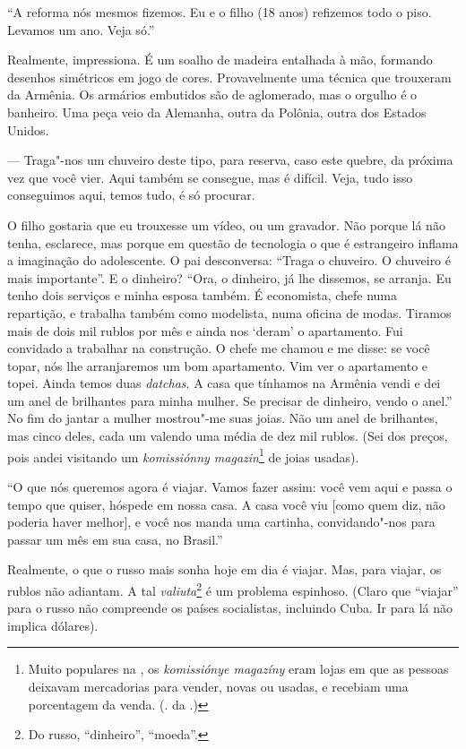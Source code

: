 ``A reforma nós mesmos fizemos. Eu e o filho (18 anos) refizemos todo o piso. Levamos um ano. Veja só.''

Realmente, impressiona. É um soalho de madeira entalhada à mão, formando desenhos simétricos em jogo de cores. Provavelmente uma
técnica que trouxeram da Armênia. Os armários embutidos são de aglomerado, mas o orgulho é o banheiro. Uma peça veio da Alemanha, outra da Polônia, outra dos Estados Unidos.

--- Traga"-nos um chuveiro deste tipo, para reserva, caso este quebre, da próxima vez que você vier. Aqui também se consegue, mas é difícil. Veja, tudo isso conseguimos aqui, temos tudo, é só procurar.

O filho gostaria que eu trouxesse um vídeo, ou um gravador. Não porque lá não tenha, esclarece, mas porque em questão de tecnologia o que é estrangeiro inflama a imaginação do adolescente. O pai desconversa: ``Traga o chuveiro. O chuveiro é mais importante''. E o dinheiro? ``Ora, o dinheiro, já lhe dissemos, se arranja. Eu tenho dois serviços e minha esposa também. É economista, chefe numa repartição, e trabalha também como modelista, numa oficina de modas. Tiramos mais de dois mil rublos por mês e ainda nos `deram' o apartamento. Fui convidado a trabalhar na construção. O chefe me chamou e me disse: se você topar, nós lhe arranjaremos um bom apartamento. Vim ver o apartamento e topei. Ainda temos duas \emph{datchas}. A casa que tínhamos na Armênia vendi e dei um anel de brilhantes para minha mulher. Se precisar de dinheiro, vendo o anel.'' No fim do jantar a mulher mostrou"-me suas joias. Não um anel de brilhantes, mas cinco deles, cada um valendo uma média de dez mil rublos. (Sei dos preços, pois andei visitando um \emph{komissiónny magazin}\footnote{Muito populares na , os \emph{komissiónye magazíny} eram lojas em que as pessoas deixavam mercadorias para vender, novas ou usadas, e recebiam uma porcentagem da venda. (. da .)} de joias usadas).

``O que nós queremos agora é viajar. Vamos fazer assim: você vem aqui e passa o tempo que quiser, hóspede em nossa casa. A casa você viu [como quem diz, não poderia haver melhor], e você nos manda uma cartinha, convidando"-nos para passar um mês em sua casa, no Brasil.''

Realmente, o que o russo mais sonha hoje em dia é viajar. Mas, para viajar, os rublos não adiantam. A tal \emph{valiuta}\footnote{Do russo, ``dinheiro'', ``moeda''.} é um problema espinhoso. (Claro que ``viajar'' para o russo não compreende os países socialistas, incluindo Cuba. Ir para lá não implica dólares).

